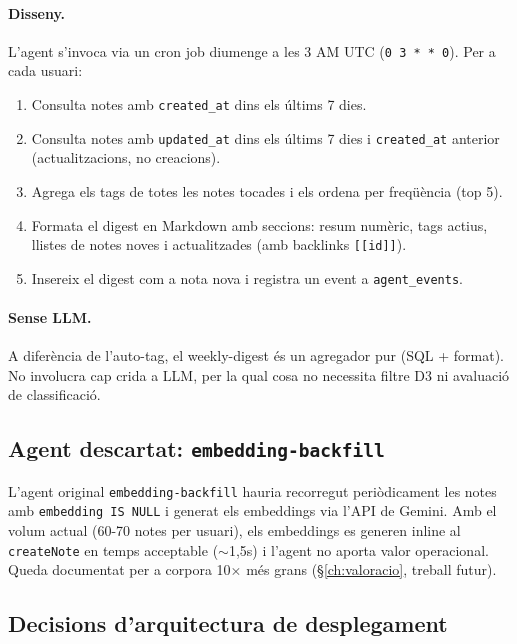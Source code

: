 \paragraph{Disseny.} L'agent s'invoca via un cron job diumenge a les 3 AM UTC (\texttt{0 3 * * 0}). Per a cada usuari:

\begin{enumerate}
    \item Consulta notes amb \texttt{created\_at} dins els últims 7 dies.
    \item Consulta notes amb \texttt{updated\_at} dins els últims 7 dies i \texttt{created\_at} anterior (actualitzacions, no creacions).
    \item Agrega els tags de totes les notes tocades i els ordena per freqüència (top 5).
    \item Formata el digest en Markdown amb seccions: resum numèric, tags actius, llistes de notes noves i actualitzades (amb backlinks \texttt{[[id]]}).
    \item Insereix el digest com a nota nova i registra un event a \texttt{agent\_events}.
\end{enumerate}

\paragraph{Sense LLM.} A diferència de l'auto-tag, el weekly-digest és un agregador pur (SQL + format). No involucra cap crida a LLM, per la qual cosa no necessita filtre D3 ni avaluació de classificació.

\subsection{Agent descartat: \texttt{embedding-backfill}}

L'agent original \texttt{embedding-backfill} hauria recorregut periòdicament les notes amb \texttt{embedding IS NULL} i generat els embeddings via l'API de Gemini. Amb el volum actual (60-70 notes per usuari), els embeddings es generen inline al \texttt{createNote} en temps acceptable ($\sim$1{,}5s) i l'agent no aporta valor operacional. Queda documentat per a corpora 10$\times$ més grans (\S\ref{ch:valoracio}, treball futur).

\subsection{Decisions d'arquitectura de desplegament}

